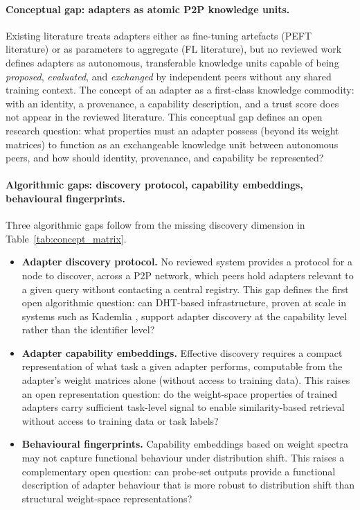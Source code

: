 \paragraph{Conceptual gap: adapters as atomic P2P knowledge units.}
Existing literature treats adapters either as fine-tuning artefacts (PEFT literature)
or as parameters to aggregate (FL literature), but no reviewed work defines adapters as autonomous, transferable knowledge units capable of being \textit{proposed}, \textit{evaluated}, and \textit{exchanged} by independent peers without any shared training context. The concept of an adapter as a first-class knowledge commodity: with an identity, a provenance, a capability description, and a trust score does not appear in the reviewed literature. This conceptual gap defines an open research question: what
properties must an adapter possess (beyond its weight matrices) to
function as an exchangeable knowledge unit between autonomous peers, and how
should identity, provenance, and capability be represented?

\paragraph{Algorithmic gaps: discovery protocol, capability embeddings, behavioural fingerprints.}
Three algorithmic gaps follow from the missing discovery dimension in Table~\ref{tab:concept_matrix}.
\begin{itemize}
  \item \textbf{Adapter discovery protocol.} No reviewed system provides a protocol for a node to discover, across a P2P network, which peers hold adapters relevant to a given query without contacting a central registry. This gap
    defines the first open algorithmic question: can DHT-based infrastructure,
    proven at scale in systems such as Kademlia \citep{MaymounkovKademlia2002},
    support adapter discovery at the capability level rather than the identifier level?
  \item \textbf{Adapter capability embeddings.} Effective discovery requires
    a compact representation of what task a given adapter performs, computable from
    the adapter's weight matrices alone (without access to training data).
    This raises an open representation question: do the weight-space properties
    of trained adapters carry sufficient task-level signal to enable
    similarity-based retrieval without access to training data or task labels?
  \item \textbf{Behavioural fingerprints.} Capability embeddings based on
    weight spectra may not capture functional behaviour under distribution shift.
    This raises a complementary open question: can probe-set
    outputs provide a functional description of adapter behaviour that is
    more robust to distribution shift than structural weight-space representations?
\end{itemize}

